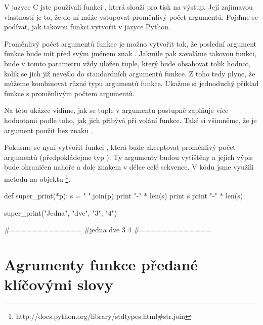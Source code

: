 V jazyce C jste používali funkci , která slouží pro tisk na výstup. Její zajímavou vlastností
je to, že do ní může vstupovat proměnlivý počet argumentů. Pojďme se podívat, jak takovou funkci
vytvořit v jazyce Python.

Proměnlivý počet argumentů funkce je možno vytvořit tak, že poslední argument funkce bude mít před
svým jménem znak \kod{*}. Jakmile pak zavoláme takovou funkci, bude v tomto parametru vždy uložen
tuple, který bude obsahovat tolik hodnot, kolik se jich již nevešlo do standardních argumentů funkce.
Z toho tedy plyne, že můžeme kombinovat různé typu argumentů funkce. Ukažme si jednoduchý příklad
funkce s proměnlivým počtem argumentů.


Na této ukázce vidíme, jak se tuple v argumentu  postupně zaplňuje více hodnotami podle toho,
jak jich přibývá při volání funkce. Také si všimněme, že je argument použit bez znaku \kod{*}.

Pokusme se nyní vytvořit funkci , která bude akceptovat proměnlivý počet argumentů
(předpokládejme typ ). Ty argumenty budou vytištěny a jejich výpis bude ohraničen
nahoře a dole znakem \kod{=} v délce celé sekvence. V kódu jsme využili metodu 
na objektu \footnote{http://docs.python.org/library/stdtypes.html\#str.join}.

\begin{python}
def super_print(*p):
  s = " ".join(p)
  print "-" * len(s)
  print s
  print "-" * len(s)

super_print("Jedna", "dve", "3", "4")

#=============
#jedna dve 3 4
#=============
\end{python}

\section{Agrumenty funkce předané klíčovými slovy}

